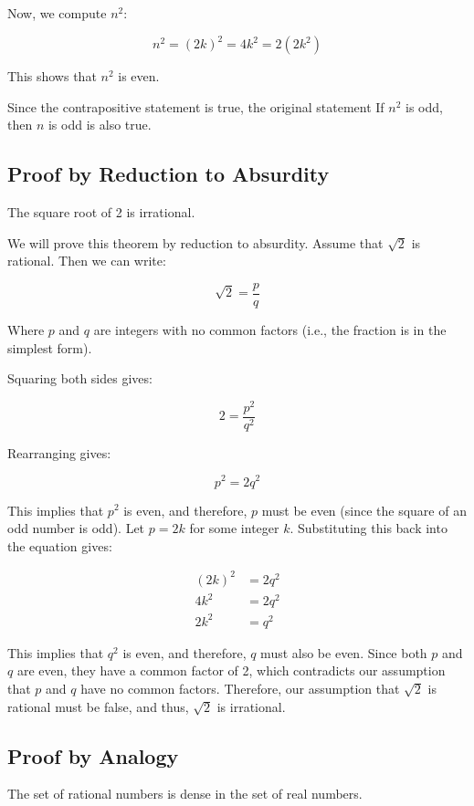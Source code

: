 Now, we compute \( n^2 \):
	
\[
	n^2 = {(2k)}^2 = 4k^2 = 2(2k^2)
\]

This shows that \( n^2 \) is even.

Since the contrapositive statement is true, the original statement If \( n^2 \) is odd, then \(n\) is 
odd is also true.

\QED

\subsection{Proof by Reduction to Absurdity}

The square root of 2 is irrational.

We will prove this theorem by reduction to absurdity. Assume that \( \sqrt{2} \) is rational. Then we can 
write:

\[
	\sqrt{2} = \frac{p}{q}
\]

Where \(p\) and \(q\) are integers with no common factors (i.e., the fraction is in the simplest 
form).

Squaring both sides gives:

\[
	2 = \frac{p^2}{q^2}
\]
	
Rearranging gives:

\[
	p^2 = 2q^2
\]
	
This implies that \( p^2 \) is even, and therefore, \(p\) must be even (since the square of an 
odd number is odd). Let \( p = 2k \) for some integer \(k\). Substituting this back into the 
equation gives:

\begin{align*}
{(2k)}^2 &= 2q^2\\	
4k^2 &= 2q^2\\
2k^2 &= q^2
\end{align*}

This implies that \( q^2 \) is even, and therefore, \(q\) must also be even.
Since both \(p\) and \(q\) are even, they have a common factor of 2, which contradicts our 
assumption that \(p\) and \(q\) have no common factors. Therefore, our assumption that 
\( \sqrt{2} \) is rational must be false, and thus, \( \sqrt{2} \) is irrational.

\QED

\subsection{Proof by Analogy}

The set of rational numbers is dense in the set of real numbers.

